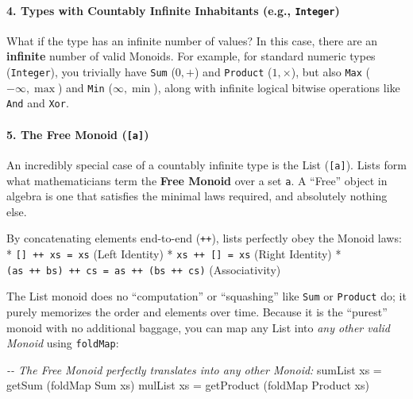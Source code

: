 \documentclass[
]{article}
\newenvironment{Shaded}{}{}
\newcommand{\CommentTok}[1]{\textcolor[rgb]{0.38,0.63,0.69}{\textit{#1}}}
\newcommand{\DataTypeTok}[1]{\textcolor[rgb]{0.56,0.13,0.00}{#1}}
\newcommand{\FunctionTok}[1]{\textcolor[rgb]{0.02,0.16,0.49}{#1}}
\newcommand{\NormalTok}[1]{#1}
\newcommand{\OtherTok}[1]{\textcolor[rgb]{0.00,0.44,0.13}{#1}}
\begin{document}
\paragraph{\texorpdfstring{4. Types with Countably Infinite Inhabitants
(e.g.,
\texttt{Integer})}{4. Types with Countably Infinite Inhabitants (e.g., Integer)}}\label{types-with-countably-infinite-inhabitants-e.g.-integer}

What if the type has an infinite number of values? In this case, there
are an \textbf{infinite} number of valid Monoids. For example, for
standard numeric types (\texttt{Integer}), you trivially have
\texttt{Sum} (\(0, \mathbf{+}\)) and \texttt{Product}
(\(1, \mathbf{\times}\)), but also \texttt{Max} (\(-\infty, \max\)) and
\texttt{Min} (\(\infty, \min\)), along with infinite logical bitwise
operations like \texttt{And} and \texttt{Xor}.

\paragraph{\texorpdfstring{5. The Free Monoid
(\texttt{{[}a{]}})}{5. The Free Monoid ({[}a{]})}}\label{the-free-monoid-a}

An incredibly special case of a countably infinite type is the List
(\texttt{{[}a{]}}). Lists form what mathematicians term the \textbf{Free
Monoid} over a set \texttt{a}. A ``Free'' object in algebra is one that
satisfies the minimal laws required, and absolutely nothing else.

By concatenating elements end-to-end (\texttt{++}), lists perfectly obey
the Monoid laws: * \texttt{{[}{]}\ ++\ xs\ =\ xs} (Left Identity) *
\texttt{xs\ ++\ {[}{]}\ =\ xs} (Right Identity) *
\texttt{(as\ ++\ bs)\ ++\ cs\ =\ as\ ++\ (bs\ ++\ cs)} (Associativity)

The List monoid does no ``computation'' or ``squashing'' like
\texttt{Sum} or \texttt{Product} do; it purely memorizes the order and
elements over time. Because it is the ``purest'' monoid with no
additional baggage, you can map any List into \emph{any other valid
Monoid} using \texttt{foldMap}:

\begin{Shaded}
\begin{Highlighting}[]
\CommentTok{{-}{-} The Free Monoid perfectly translates into any other Monoid:}
\NormalTok{sumList xs }\OtherTok{=}\NormalTok{ getSum (}\FunctionTok{foldMap} \DataTypeTok{Sum}\NormalTok{ xs)}
\NormalTok{mulList xs }\OtherTok{=}\NormalTok{ getProduct (}\FunctionTok{foldMap} \DataTypeTok{Product}\NormalTok{ xs)}
\end{Highlighting}
\end{Shaded}
\end{document}
